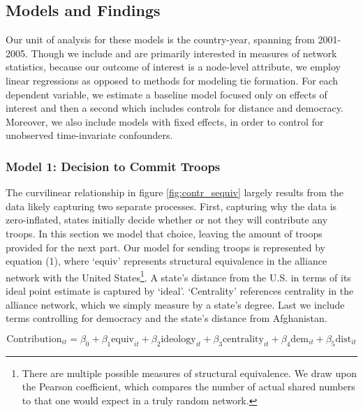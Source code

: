 \documentclass[12pt,letterpaper]{article}
\begin{document}
	\subsection{Models and Findings}
	 Our unit of analysis for these models is the country-year, spanning from 2001-2005. Though we include and are primarily interested in measures of network statistics, because our outcome of interest is a node-level attribute, we employ linear regressions as opposed to methods for modeling tie formation. For each dependent variable, we estimate a baseline model focused only on effects of interest and then a second which includes controls for distance and democracy. Moreover, we also include models with fixed effects, in order to control for unobserved time-invariate confounders.

		\subsubsection{Model 1: Decision to Commit Troops}
		The curvilinear relationship in figure \ref{fig:contr_sequiv} largely results from the data likely capturing two separate processes. First, capturing why the data is zero-inflated, states initially decide whether or not they will contribute any troops. In this section we model that choice, leaving the amount of troops provided for the next part. Our model for sending troops is represented by equation (1), where `equiv' represents structural equivalence in the alliance network with the United States\footnote{There are multiple possible measures of structural equivalence. We draw upon the Pearson coefficient, which compares the number of actual shared numbers to that one would expect in a truly random network.}. A state's distance from the U.S. in terms of its ideal point estimate is captured by `ideal'. `Centrality' references centrality in the alliance network, which we simply measure by a state's degree. Last we include terms controlling for democracy and the state's distance from Afghanistan.

			\vspace{-2em}
			\begin{equation}
				\text{Contribution}_{it} = \beta_0 + \beta_1\text{equiv}_{it} + \beta_2\text{ideology}_{it} + \beta_3\text{centrality}_{it} + \beta_4\text{dem}_{it} + \beta_5\text{dist}_{it}
			\end{equation}
\end{document}
